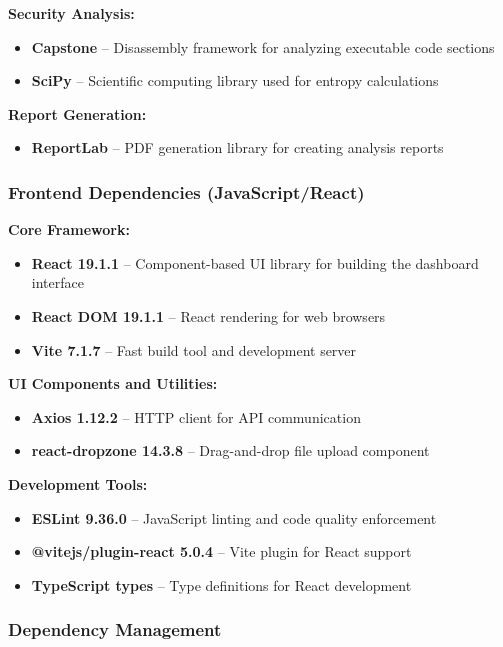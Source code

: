 \textbf{Security Analysis:}
\begin{itemize}
    \item \textbf{Capstone} -- Disassembly framework for analyzing executable code sections
    \item \textbf{SciPy} -- Scientific computing library used for entropy calculations
\end{itemize}

\textbf{Report Generation:}
\begin{itemize}
    \item \textbf{ReportLab} -- PDF generation library for creating analysis reports
\end{itemize}

\subsubsection{Frontend Dependencies (JavaScript/React)}

\textbf{Core Framework:}
\begin{itemize}
    \item \textbf{React 19.1.1} -- Component-based UI library for building the dashboard interface
    \item \textbf{React DOM 19.1.1} -- React rendering for web browsers
    \item \textbf{Vite 7.1.7} -- Fast build tool and development server
\end{itemize}

\textbf{UI Components and Utilities:}
\begin{itemize}
    \item \textbf{Axios 1.12.2} -- HTTP client for API communication
    \item \textbf{react-dropzone 14.3.8} -- Drag-and-drop file upload component
\end{itemize}

\textbf{Development Tools:}
\begin{itemize}
    \item \textbf{ESLint 9.36.0} -- JavaScript linting and code quality enforcement
    \item \textbf{@vitejs/plugin-react 5.0.4} -- Vite plugin for React support
    \item \textbf{TypeScript types} -- Type definitions for React development
\end{itemize}

\subsubsection{Dependency Management}

